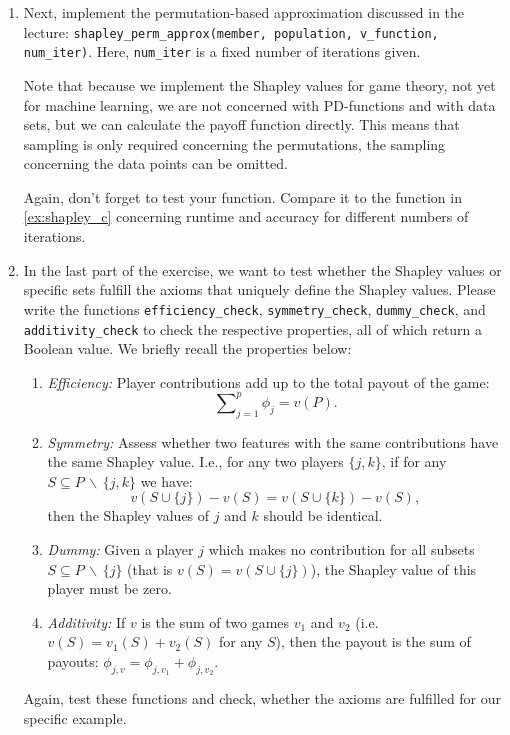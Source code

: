 {\begin{enumerate}
    \item \label{ex:shapley_d}
    Next, implement the permutation-based approximation discussed in the lecture: \texttt{shapley\_perm\_approx(member, population, v\_function, num\_iter)}.
    Here, \texttt{num\_iter} is a fixed number of iterations given.
    
    Note that because we implement the Shapley values for game theory, not yet for machine learning, we are not concerned with PD-functions and with data sets, but we can calculate the payoff function directly.
    This means that sampling is only required concerning the permutations, the sampling concerning the data points can be omitted.

    Again, don't forget to test your function. Compare it to the function in \ref{ex:shapley_c} concerning runtime and accuracy for different numbers of iterations.
    
    \item \label{ex:shapley_e}
    In the last part of the exercise, we want to test whether the Shapley values or specific sets fulfill the axioms that uniquely define the Shapley values.
    Please write the functions \texttt{efficiency\_check}, \texttt{symmetry\_check}, \texttt{dummy\_check}, and \texttt{additivity\_check} to check the respective properties, all of which return a Boolean value.
    We briefly recall the properties below:
    \begin{enumerate}
    
        \item \textit{Efficiency:} Player contributions add up to the total payout of the game:
            $$\sum\nolimits_{j=1}^p\phi_j = v(P).$$
            
        \item \textit{Symmetry:} Assess whether two features with the same contributions have the same Shapley value. I.e., for any two players $\{j,k\}$, if for any $S \subseteq P\, \backslash\, \{j,k\}$ we have:
            $$v(S \cup \{j\}) - v(S) = v(S \cup \{k\}) -  v(S),$$
        then the Shapley values of $j$ and $k$ should be identical.
        
        \item \textit{Dummy:} Given a player $j$ which makes no contribution for all subsets $S \subseteq P \, \backslash\, \{j\}$ (that is $v(S) = v(S \cup \{j\})$), the Shapley value of this player must be zero.
        
        \item \textit{Additivity:} If $v$ is the sum of two games $v_1$ and $v_2$ (i.e. $v(S) = v_1(S) + v_2(S)$ for any $S$), then the payout is the sum of payouts: $\phi_{j,v} = \phi_{j,v_1} + \phi_{j, v_2}$.
        
    \end{enumerate}
    
    Again, test these functions and check, whether the axioms are fulfilled for our specific example.
    
\end{enumerate}

}
